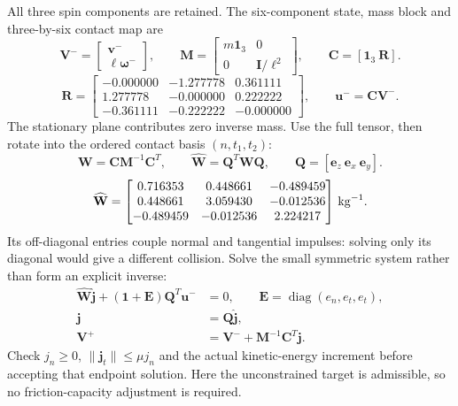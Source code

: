 All three spin components are retained. The six-component state, mass block and three-by-six contact map are
\begin{equation}
\mathbf V^-=\begin{bmatrix}\mathbf v^-\\\ell\boldsymbol\omega^-\end{bmatrix},\qquad
\mathbf M=\begin{bmatrix}m\mathbf1_3&0\\0&\mathbf I/\ell^2\end{bmatrix},\qquad
\mathbf C=[\mathbf1_3\ \mathbf R].
\end{equation}
\begin{equation}
\mathbf R=\begin{bmatrix}-0.000000 & -1.277778 & 0.361111\\1.277778 & -0.000000 & 0.222222\\-0.361111 & -0.222222 & -0.000000\end{bmatrix},\qquad\mathbf u^-=\mathbf C\mathbf V^-.
\end{equation}
The stationary plane contributes zero inverse mass. Use the full tensor, then rotate into the ordered contact basis $(n,t_1,t_2)$:
\begin{equation}
\mathbf W=\mathbf C\mathbf M^{-1}\mathbf C^T,\qquad
\widehat{\mathbf W}=\mathbf Q^T\mathbf W\mathbf Q,\qquad
\mathbf Q=[\mathbf e_z\ \mathbf e_x\ \mathbf e_y].
\end{equation}
\begin{equation}
\widehat{\mathbf W}=\begin{bmatrix}0.716353 & 0.448661 & -0.489459\\0.448661 & 3.059430 & -0.012536\\-0.489459 & -0.012536 & 2.224217\end{bmatrix}\,{\rm kg^{-1}}.
\end{equation}
Its off-diagonal entries couple normal and tangential impulses: solving only its diagonal would give a different collision. Solve the small symmetric system rather than form an explicit inverse:
\begin{align}
\widehat{\mathbf W}\widehat{\mathbf j}+(\mathbf1+\mathbf E)\mathbf Q^T\mathbf u^-&=0,\qquad
\mathbf E=\operatorname{diag}(e_n,e_t,e_t),\\
\mathbf j&=\mathbf Q\widehat{\mathbf j},\\
\mathbf V^+&=\mathbf V^-+\mathbf M^{-1}\mathbf C^T\mathbf j.
\end{align}
Check $j_n\ge0$, $\|\mathbf j_t\|\le\mu j_n$ and the actual kinetic-energy increment before accepting that endpoint solution. Here the unconstrained target is admissible, so no friction-capacity adjustment is required.
